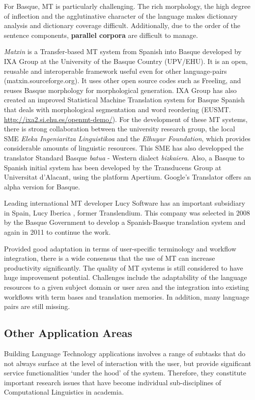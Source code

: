 \begin{multicols}{2}
For Basque, MT is particularly challenging. The rich morphology, the high degree of inflection and the agglutinative character of the language makes dictionary analysis and dictionary coverage difficult. Additionally, due to the order of the sentence components, \textbf{parallel corpora} are difficult to manage. 

\textit{Matxin} is a Transfer-based MT system from Spanish into Basque developed by IXA Group at the University of the Basque Country (UPV/EHU). It is an open, reusable and interoperable framework useful even for other language-pairs (matxin.sourceforge.org). It uses other open source codes such as Freeling, and reuses Basque morphology for morphological generation. IXA Group has also created an improved Statistical Machine Translation system for Basque Spanish that deals with morphological segmentation and word reordering (EUSMT. \url{http://ixa2.si.ehu.es/openmt-demo/}).  For the development of these MT systems, there is strong collaboration between the university research group, the local SME \textit{Eleka Ingeniaritza Linguistikoa} and the \textit{Elhuyar Foundation}, which provides considerable amounts of linguistic resources. This SME has also developped the translator Standard Basque \textit{batua} - Western dialect \textit{bizkaiera}. Also, a Basque to Spanish initial system has been developed by the Transducens Group at Universitat d’Alacant, using the platform Apertium.  Google's Translator offers an alpha version for Basque.

Leading international MT developer Lucy Software has an important subsidiary in Spain, Lucy Iberica \cite{BAS-Nota35}, former Trans\-len\-dium. This company was selected in 2008 by the Basque Government to develop a Spanish-Basque translation system and again in 2011 to continue the work. 

Provided good adaptation in terms of user-specific terminology and workflow integration, there is a wide consensus that the use of MT can increase productivity significantly. The quality of MT systems is still considered to have huge improvement potential. Challenges include the adaptability of the language resources to a given subject domain or user area and the integration into existing workflows with term bases and translation memories. In addition, many language pairs are still missing.

\subsection{Other Application Areas}
    Building Language Technology applications involves a range of subtasks that do not always surface at the level of interaction with the user,  but provide significant service functionalities ‘under the hood’ of the system. Therefore, they constitute important research issues that have become individual sub-disciplines of Computational Linguistics in academia. 


\end{multicols}

